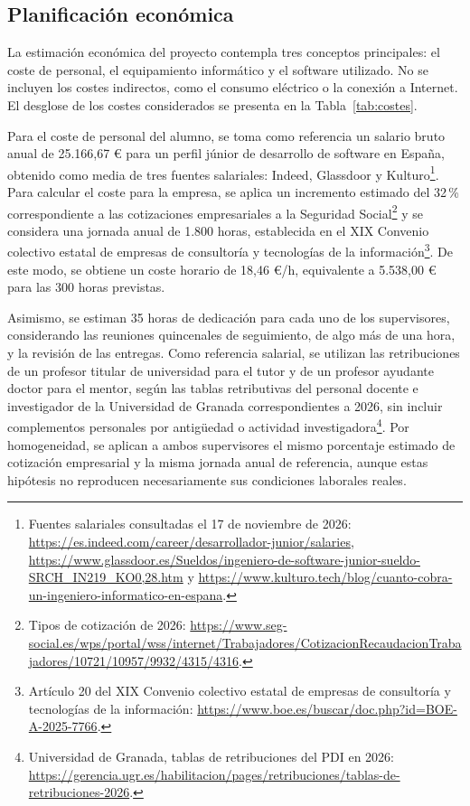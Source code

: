 \subsection{Planificación económica}
\label{subsec:planificacion-economica}

La estimación económica del proyecto contempla tres conceptos principales: el coste de personal, el equipamiento informático y el software utilizado. No se incluyen los costes indirectos, como el consumo eléctrico o la conexión a Internet. El desglose de los costes considerados se presenta en la Tabla~\ref{tab:costes}.

Para el coste de personal del alumno, se toma como referencia un salario bruto anual de 25.166{,}67 \euro{} para un perfil júnior de desarrollo de software en España, obtenido como media de tres fuentes salariales: Indeed, Glassdoor y Kulturo\footnote{Fuentes salariales consultadas el 17 de noviembre de 2026: \url{https://es.indeed.com/career/desarrollador-junior/salaries}, \url{https://www.glassdoor.es/Sueldos/ingeniero-de-software-junior-sueldo-SRCH_IN219_KO0,28.htm} y \url{https://www.kulturo.tech/blog/cuanto-cobra-un-ingeniero-informatico-en-espana}.}. Para calcular el coste para la empresa, se aplica un incremento estimado del 32\,\% correspondiente a las cotizaciones empresariales a la Seguridad Social\footnote{Tipos de cotización de 2026: \url{https://www.seg-social.es/wps/portal/wss/internet/Trabajadores/CotizacionRecaudacionTrabajadores/10721/10957/9932/4315/4316}.} y se considera una jornada anual de 1.800 horas, establecida en el XIX Convenio colectivo estatal de empresas de consultoría y tecnologías de la información\footnote{Artículo 20 del XIX Convenio colectivo estatal de empresas de consultoría y tecnologías de la información: \url{https://www.boe.es/buscar/doc.php?id=BOE-A-2025-7766}.}. De este modo, se obtiene un coste horario de 18{,}46 \euro{}/h, equivalente a 5.538{,}00 \euro{} para las 300 horas previstas.

Asimismo, se estiman 35 horas de dedicación para cada uno de los supervisores, considerando las reuniones quincenales de seguimiento, de algo más de una hora, y la revisión de las entregas. Como referencia salarial, se utilizan las retribuciones de un profesor titular de universidad para el tutor y de un profesor ayudante doctor para el mentor, según las tablas retributivas del personal docente e investigador de la Universidad de Granada correspondientes a 2026, sin incluir complementos personales por antigüedad o actividad investigadora\footnote{Universidad de Granada, tablas de retribuciones del PDI en 2026: \url{https://gerencia.ugr.es/habilitacion/pages/retribuciones/tablas-de-retribuciones-2026}.}. Por homogeneidad, se aplican a ambos supervisores el mismo porcentaje estimado de cotización empresarial y la misma jornada anual de referencia, aunque estas hipótesis no reproducen necesariamente sus condiciones laborales reales.

